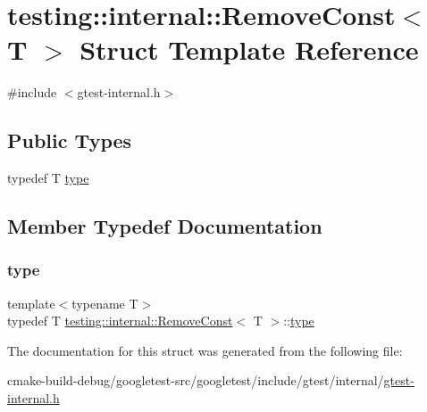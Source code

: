 \hypertarget{structtesting_1_1internal_1_1RemoveConst}{}\section{testing\+::internal\+::Remove\+Const$<$ T $>$ Struct Template Reference}
\label{structtesting_1_1internal_1_1RemoveConst}


{\ttfamily \#include $<$gtest-\/internal.\+h$>$}

\subsection*{Public Types}
\begin{DoxyCompactItemize}
\item 
typedef T \mbox{\hyperlink{structtesting_1_1internal_1_1RemoveConst_a1be32027ea4edcc0d15abd59aba4a97f}{type}}
\end{DoxyCompactItemize}


\subsection{Member Typedef Documentation}
\mbox{\label{structtesting_1_1internal_1_1RemoveConst_a1be32027ea4edcc0d15abd59aba4a97f}} 
\subsubsection{\texorpdfstring{type}{type}}
{\footnotesize\ttfamily template$<$typename T$>$ \\
typedef T \mbox{\hyperlink{structtesting_1_1internal_1_1RemoveConst}{testing\+::internal\+::\+Remove\+Const}}$<$ T $>$\+::\mbox{\hyperlink{structtesting_1_1internal_1_1RemoveConst_a1be32027ea4edcc0d15abd59aba4a97f}{type}}}



The documentation for this struct was generated from the following file\+:\begin{DoxyCompactItemize}
\item 
cmake-\/build-\/debug/googletest-\/src/googletest/include/gtest/internal/\mbox{\hyperlink{gtest-internal_8h}{gtest-\/internal.\+h}}\end{DoxyCompactItemize}
